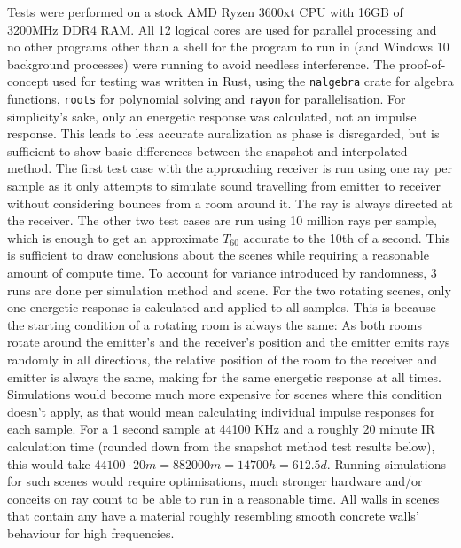 Tests were performed on a stock AMD Ryzen 3600xt CPU with 16GB of 3200MHz DDR4 RAM.
All 12 logical cores are used for parallel processing
and no other programs other than a shell for the program to run in (and Windows 10 background processes) were running to avoid needless interference.
\newline
The proof-of-concept used for testing was written in Rust, using the \verb|nalgebra| crate for algebra functions,
\verb|roots| for polynomial solving and \verb|rayon| for parallelisation.
For simplicity's sake, only an energetic response was calculated, not an impulse response.
This leads to less accurate auralization as phase is disregarded,
but is sufficient to show basic differences between the snapshot and interpolated method.
\newline
The first test case with the approaching receiver is run using one ray per sample
as it only attempts to simulate sound travelling from emitter to receiver
without considering bounces from a room around it.
The ray is always directed at the receiver.
\newline
The other two test cases are run using 10 million rays per sample,
which is enough to get an approximate \(T_{60}\) accurate to the 10th of a second.
This is sufficient to draw conclusions about the scenes while requiring a reasonable amount of compute time.
To account for variance introduced by randomness, 3 runs are done per simulation method and scene.
\newline
For the two rotating scenes, only one energetic response is calculated and applied to all samples.
This is because the starting condition of a rotating room is always the same:
As both rooms rotate around the emitter's and the receiver's position
and the emitter emits rays randomly in all directions,
the relative position of the room to the receiver and emitter is always the same,
making for the same energetic response at all times.
\newline
Simulations would become much more expensive for scenes where this condition doesn't apply,
as that would mean calculating individual impulse responses for each sample.
For a 1 second sample at 44100 KHz and a roughly 20 minute IR calculation time
(rounded down from the snapshot method test results below),
this would take \(44100 \cdot 20 m = 882000 m = 14700 h = 612.5 d\).
Running simulations for such scenes would require optimisations, much stronger hardware
and/or conceits on ray count to be able to run in a reasonable time.
\newline
All walls in scenes that contain any have a material roughly resembling smooth concrete walls' behaviour for high frequencies.
